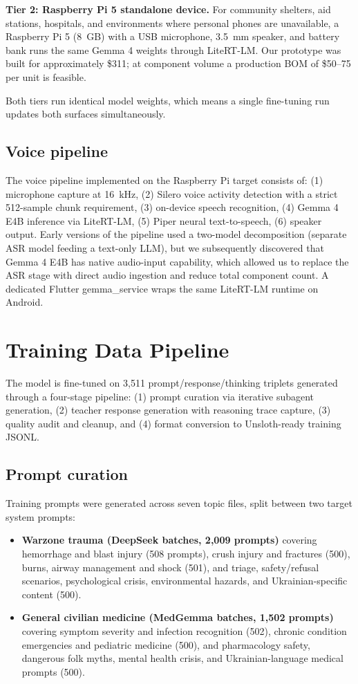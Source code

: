 \documentclass{article}
\theoremstyle{plain}
\theoremstyle{definition}
\theoremstyle{remark}
\begin{document}
\textbf{Tier 2: Raspberry Pi 5 standalone device.} For community shelters, aid stations, hospitals, and environments where personal phones are unavailable, a Raspberry Pi 5 (8~GB) with a USB microphone, 3.5~mm speaker, and battery bank runs the same Gemma 4 weights through LiteRT-LM. Our prototype was built for approximately \$311; at component volume a production BOM of \$50--75 per unit is feasible.

Both tiers run identical model weights, which means a single fine-tuning run updates both surfaces simultaneously.

\subsection{Voice pipeline}

The voice pipeline implemented on the Raspberry Pi target consists of: (1) microphone capture at 16~kHz, (2) Silero voice activity detection with a strict 512-sample chunk requirement, (3) on-device speech recognition, (4) Gemma 4 E4B inference via LiteRT-LM, (5) Piper neural text-to-speech, (6) speaker output. Early versions of the pipeline used a two-model decomposition (separate ASR model feeding a text-only LLM), but we subsequently discovered that Gemma 4 E4B has native audio-input capability, which allowed us to replace the ASR stage with direct audio ingestion and reduce total component count. A dedicated Flutter gemma\_service wraps the same LiteRT-LM runtime on Android.

\section{Training Data Pipeline}

The model is fine-tuned on 3{,}511 prompt/response/thinking triplets generated through a four-stage pipeline: (1) prompt curation via iterative subagent generation, (2) teacher response generation with reasoning trace capture, (3) quality audit and cleanup, and (4) format conversion to Unsloth-ready training JSONL.

\subsection{Prompt curation}

Training prompts were generated across seven topic files, split between two target system prompts:

\begin{itemize}
\item \textbf{Warzone trauma (DeepSeek batches, 2{,}009 prompts)} covering hemorrhage and blast injury (508 prompts), crush injury and fractures (500), burns, airway management and shock (501), and triage, safety/refusal scenarios, psychological crisis, environmental hazards, and Ukrainian-specific content (500).
\item \textbf{General civilian medicine (MedGemma batches, 1{,}502 prompts)} covering symptom severity and infection recognition (502), chronic condition emergencies and pediatric medicine (500), and pharmacology safety, dangerous folk myths, mental health crisis, and Ukrainian-language medical prompts (500).
\end{itemize}
\end{document}

